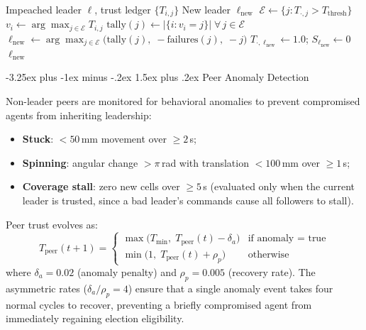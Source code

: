 \documentclass[conference]{IEEEtran}
\makeatletter
\renewcommand{\subsection}{\@startsection{subsection}{2}{\z@}%
  {-3.25ex plus -1ex minus -.2ex}%
  {1.5ex plus .2ex}%
  {\normalfont\normalsize\itshape\centering}}
\makeatother
\begin{document}
\begin{algorithm}[h]
\caption{Merit-Based Leader Election}
\label{alg:election}
\begin{algorithmic}[1]
\REQUIRE Impeached leader $\ell$, trust ledger $\{T_{i,j}\}$
\ENSURE New leader $\ell_{\text{new}}$
\STATE $\mathcal{E} \leftarrow \{j : T_{\cdot,j} > T_{\text{thresh}}\}$
    \STATE $v_i \leftarrow \arg\max_{j \in \mathcal{E}} T_{i,j}$
\ENDFOR
\STATE $\text{tally}(j) \leftarrow |\{i : v_i = j\}| \;\forall\, j \in \mathcal{E}$
\STATE $\ell_{\text{new}} \leftarrow \arg\max_{j \in \mathcal{E}}
       \bigl(\text{tally}(j),\;
       {-}\text{failures}(j),\;
       {-}j\bigr)$
\STATE $T_{\cdot,\ell_{\text{new}}} \leftarrow 1.0$;\;
       $S_{\ell_{\text{new}}} \leftarrow 0$
\RETURN $\ell_{\text{new}}$
\end{algorithmic}
\end{algorithm}

\subsection{Peer Anomaly Detection}
\label{sec:peer_anomaly}

Non-leader peers are monitored for behavioral anomalies to prevent compromised agents from inheriting leadership:
\begin{itemize}
    \item \textbf{Stuck}: $< 50\,$mm movement over $\geq 2\,$s;
    \item \textbf{Spinning}: angular change $> \pi\,$rad with translation $< 100\,$mm over $\geq 1\,$s;
    \item \textbf{Coverage stall}: zero new cells over $\geq 5\,$s (evaluated only when the current leader is trusted, since a bad leader's commands cause all followers to stall).
\end{itemize}
Peer trust evolves as:
\begin{equation}
    T_{\text{peer}}(t{+}1) = \begin{cases}
        \max\bigl(T_{\min},\; T_{\text{peer}}(t) - \delta_a\bigr)
            & \text{if anomaly = true} \\[4pt]
        \min\bigl(1,\; T_{\text{peer}}(t) + \rho_p\bigr)
            & \text{otherwise}
    \end{cases}
    \label{eq:peer_trust}
\end{equation}
where $\delta_a = 0.02$ (anomaly penalty) and $\rho_p = 0.005$ (recovery rate). The asymmetric rates ($\delta_a / \rho_p = 4$) ensure that a single anomaly event takes four normal cycles to recover, preventing a briefly compromised agent from immediately regaining election eligibility.
\end{document}
